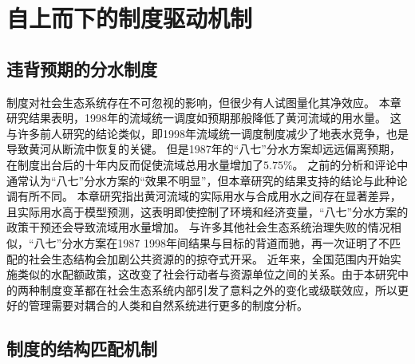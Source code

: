 \section{自上而下的制度驱动机制}

\subsection{违背预期的分水制度}

制度对社会\textendash{}生态系统存在不可忽视的影响，但很少有人试图量化其净效应\cite{cumming2020a}。
本章研究结果表明，1998年的流域统一调度如预期那般降低了黄河流域的用水量。
这与许多前人研究的结论类似，即1998年流域统一调度制度减少了地表水竞争，也是导致黄河从断流中恢复的关键\cite{chen2021,huangang2002,an2007}。
但是1987年的``八七''分水方案却远远偏离预期，在制度出台后的十年内反而促使流域总用水量增加了$5.75\%$。
之前的分析和评论中通常认为``八七''分水方案的“效果不明显”，但本章研究的结果支持的结论与此种论调有所不同。
本章研究指出黄河流域的实际用水与合成用水之间存在显著差异，且实际用水高于模型预测\cite{abadie2015,hill2021}，这表明即使控制了环境和经济变量，``八七''分水方案的政策干预还会导致流域用水量增加。
与许多其他社会生态系统治理失败的情况相似，``八七''分水方案在1987 \textendash{} 1998年间结果与目标的背道而驰，再一次证明了不匹配的社会生态结构会加剧公共资源的的掠夺式开采\cite{kellenberg2009,cai2016,barnes2019}。
近年来，全国范围内开始实施类似的水配额政策，这改变了社会行动者与资源单位之间的关系。由于本研究中的两种制度变革都在社会\textendash{}生态系统内部引发了意料之外的变化或级联效应，所以更好的管理需要对耦合的人类和自然系统进行更多的制度分析。

%
\subsection{制度的结构匹配机制}


